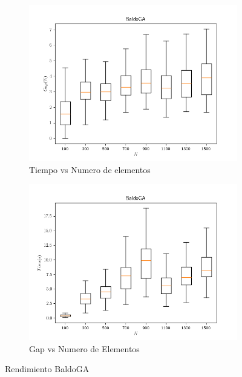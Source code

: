 \documentclass[spanish, a4paper, 12pt, openany,final]{book}
\begin{document}
\begin{figure}[h]
	\centering
	\begin{subfigure}{.5\textwidth}
		\includegraphics[width=1\linewidth]{graphs/BaldoGA_gap.png}
		\caption{Tiempo vs Numero de elementos}
	\end{subfigure}%
	\begin{subfigure}{.5\textwidth}
		\includegraphics[width=1\linewidth]{graphs/BaldoGA_time.png}
		\caption{Gap vs Numero de Elementos}
	\end{subfigure}%
	\caption{Rendimiento BaldoGA}
	\label{fig:perf_baldoga}
\end{figure}


\newcommand{\resultadosZ}[1]{
	\begin{figure}[h]
		\centering
		\begin{subfigure}{.5\textwidth}
			\texttt{[image: graphs/Z\_threshold\#1\_time.png]}
			\caption{Tiempo vs Numero de elementos}
		\end{subfigure}%
		\begin{subfigure}{.5\textwidth}
			\texttt{[image: graphs/Z\_threshold\#1\_gap.png]}
			\caption{$Gap(\%)$ vs Numero de Elementos}
		\end{subfigure}%
		\caption{Rendimiento Algorimo propuesto $(\tau=#1)$}
		\label{fig:perf_z_#1}
	
	\end{figure}
}
\end{document}
